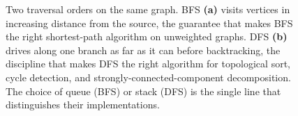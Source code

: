 \begin{figure}[ht]
\caption{Two traversal orders on the same graph. BFS \textbf{(a)}
visits vertices in increasing distance from the source, the
guarantee that makes BFS the right shortest-path algorithm on
unweighted graphs. DFS \textbf{(b)} drives along one branch as
far as it can before backtracking, the discipline that makes DFS
the right algorithm for topological sort, cycle detection, and
strongly-connected-component decomposition. The choice of queue
(BFS) or stack (DFS) is the single line that distinguishes their
implementations.}
\label{fig:vol02:ch17:bfs-dfs}
\end{figure}
